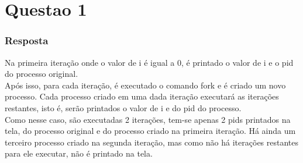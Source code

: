 \chapter{Questao 1}

\subsection*{Resposta}

Na primeira iteração onde o valor de i é igual a 0, é printado o valor de i e o pid do processo original.\\ 
    Após isso, para cada iteração, é executado o comando fork e é criado um novo processo. Cada processo criado em uma dada iteração executará as iterações restantes, isto é, serão printados o valor de i e do pid do processo.\\
    Como nesse caso, são executadas 2 iterações, tem-se apenas 2 pids printados na tela, do processo original e do processo criado na primeira iteração. Há ainda um terceiro processo criado na segunda iteração, mas como não há iterações restantes para ele executar, não é printado na tela.
